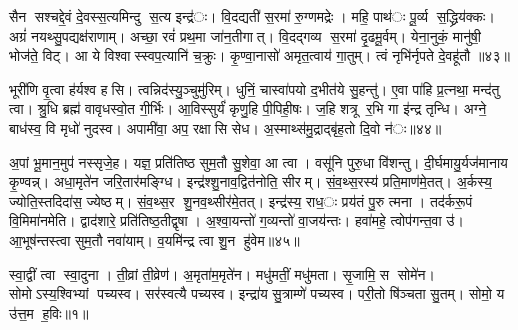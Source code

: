 सैन सश्चद्दे॒वं दे॒वस्स॒त्यमिन्दु स॒त्य इन्द्र॑ः। वि॒दद्यती॑ स॒रमा॑ रु॒ग्णमद्रेः। महि॒ पाथ॑ः पू॒र्व्य स॒द्ध्रिय॑क्कः। अग्रं॑ नयथ्सु॒पद्यक्ष॑राणाम्। अच्छा॒ रवं॑ प्रथ॒मा जा॑न॒तीगात्। वि॒दद्गव्य स॒रमा॑ दृ॒ढमू॒र्वम्। येना॒नुकं॒ मानु॑षी॒ भोज॑ते॒ विट्। आ ये विश्वास्स्वप॒त्यानि॑ च॒क्रुः। कृ॒ण्वा॒नासो॑ अमृत॒त्वाय॑ गा॒तुम्। त्वं नृभि॑र्नृपते दे॒वहू॑तौ ॥४३॥

भूरी॑णि वृ॒त्वा ह॑र्यश्व हसि। त्वन्निद॑स्यु॒ञ्चुमु॑रिम्। धुनिं॒ चास्वा॑पयो द॒भीत॑ये सु॒हन्तु॑। ए॒वा पा॑हि प्र॒त्नथा॒ मन्द॑तु त्वा। श्रु॒धि ब्रह्म॑ वावृधस्वो॒त गी॒र्भिः। आ॒विस्सुर्यं॑ कृणु॒हि पी॒पिही॒षः। ज॒हि शत्रू र॒भि गा इ॑न्द्र तृन्धि। अग्ने॒ बाध॑स्व॒ वि मृधो॑ नुदस्व। अपामी॑वा॒ अप॒ रक्षासि सेध। अ॒स्माथ्स॑मु॒द्राद्बृ॑ह॒तो दि॒वो न॑ः॥४४॥

अ॒पां भू॒मान॒मुप॑ नस्सृजे॒ह। यज्ञ॒ प्रति॑तिष्ठ सुम॒तौ सु॒शेवा॒ आ त्वा। वसू॑नि पुरु॒धा वि॑शन्तु। दी॒र्घमायु॒र्यज॑मानाय कृ॒ण्वन्न्। अधा॒मृते॑न जरि॒तार॑मङ्ग्धि। इन्द्र॑श्शु॒नाव॒द्वित॑नोति॒ सीरम्। सं॒व॒थ्स॒रस्य॑ प्रति॒माण॑मे॒तत्। अ॒र्कस्य॒ ज्योति॒स्तदिदा॑स॒ ज्येष्ठम्। सं॒व॒थ्स॒र शु॒नव॒थ्सीर॑मे॒तत्। इन्द्र॑स्य॒ राध॒ः प्रय॑तं पु॒रु त्मना। तद॑र्करू॒पं वि॒मिमा॑नमेति। द्वाद॑शारे॒ प्रति॑तिष्ठ॒तीद्वृषा। अ॒श्वा॒यन्तो॑ ग॒व्यन्तो॑ वा॒जय॑न्तः। हवा॑महे॒ त्वोप॑गन्त॒वा उ॑। आ॒भूष॑न्तस्त्वा सुम॒तौ नवा॑याम्। व॒यमि॑न्द्र त्वा शु॒न हु॑वेम॥४५॥




स्वा॒द्वीं त्वा स्वा॒दुना। ती॒व्रां ती॒व्रेण॑। अ॒मृता॑म॒मृते॑न। मधु॑मतीं॒ मधु॑मता। सृ॒जामि॒ स सोमे॑न। सोमोऽस्य॒श्विभ्यां पच्यस्व। सर॑स्वत्यै पच्यस्व। इन्द्रा॑य सु॒त्राम्णे॑ पच्यस्व। परी॒तो षि॑ञ्चता सु॒तम्। सोमो॒ य उ॑त्त॒म ह॒विः॥१॥

